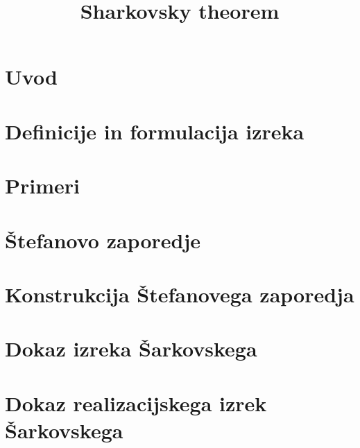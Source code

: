 \documentclass[mat2]{fmfdelo}
\title{Sharkovsky theorem}
\begin{document}
\section{Uvod}


\section{Definicije in formulacija izreka}


\section{Primeri}


\section{Štefanovo zaporedje} \label{stefan_zap} 




\section{Konstrukcija Štefanovega zaporedja} \label{konssz}


\section{Dokaz izreka Šarkovskega}


\section{Dokaz realizacijskega izrek Šarkovskega}\label{sec:realizacija}

\end{document}
